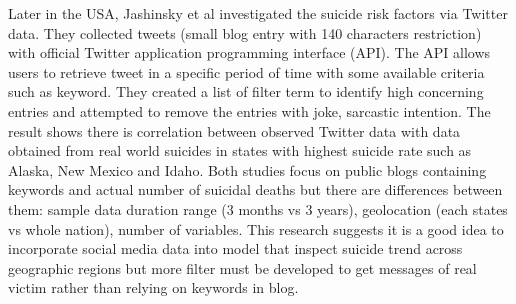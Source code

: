 Later in the USA, Jashinsky et al \cite{Jashinsky2014}  investigated the suicide risk factors via Twitter data. They collected tweets (small blog entry with 140 characters restriction) with official Twitter application programming interface (API). The API allows users to retrieve tweet in a specific period of time with some available criteria such as keyword. They created a list of filter term to identify high concerning entries and attempted to remove the entries with joke, sarcastic intention. The result shows there is correlation between observed Twitter data with data obtained from real world suicides in states with highest suicide rate such as Alaska, New Mexico and Idaho. Both studies focus on public blogs containing keywords and actual number of suicidal deaths but there are differences between them: sample data duration range (3 months vs 3 years), geolocation (each states vs whole nation), number of variables. This research suggests it is a good idea to incorporate social media data into model that inspect suicide trend across geographic regions but more filter must be developed to get messages of real victim rather than relying on keywords in blog.\\

